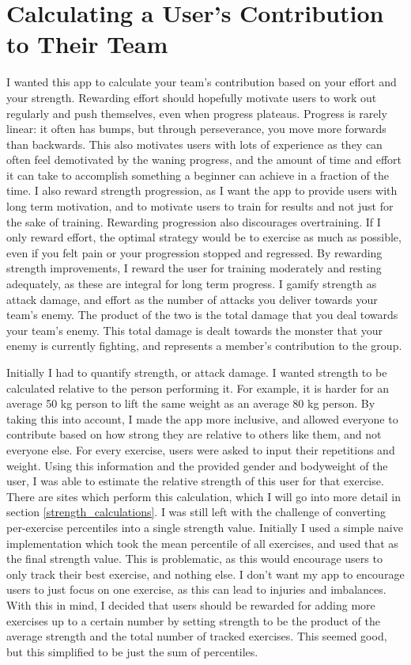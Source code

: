 \documentclass{l4proj}
\begin{document}
\section{Calculating a User's Contribution to Their Team}
I wanted this app to calculate your team's contribution based on your effort and your strength. Rewarding effort should hopefully motivate users to work out regularly and push themselves, even when progress plateaus. Progress is rarely linear: it often has bumps, but through perseverance, you move more forwards than backwards. This also motivates users with lots of experience as they can often feel demotivated by the waning progress, and the amount of time and effort it can take to accomplish something a beginner can achieve in a fraction of the time. I also reward strength progression, as I want the app to provide users with long term motivation, and to motivate users to train for results and not just for the sake of training. Rewarding progression also discourages overtraining. If I only reward effort, the optimal strategy would be to exercise as much as possible, even if you felt pain or your progression stopped and regressed. By rewarding strength improvements, I reward the user for training moderately and resting adequately, as these are integral for long term progress. I gamify strength as attack damage, and effort as the number of attacks you deliver towards your team's enemy. The product of the two is the total damage that you deal towards your team's enemy. This total damage is dealt towards the monster that your enemy is currently fighting, and represents a member's contribution to the group.

Initially I had to quantify strength, or attack damage. I wanted strength to be calculated relative to the person performing it. For example, it is harder for an average 50 kg person to lift the same weight as an average 80 kg person. By taking this into account, I made the app more inclusive, and allowed everyone to contribute based on how strong they are relative to others like them, and not everyone else. For every exercise, users were asked to input their repetitions and weight. Using this information and the provided gender and bodyweight of the user, I was able to estimate the relative strength of this user for that exercise. There are sites which perform this calculation, which I will go into more detail in section \ref{strength_calculations}. I was still left with the challenge of converting per-exercise percentiles into a single strength value. Initially I used a simple naive implementation which took the mean percentile of all exercises, and used that as the final strength value. This is problematic, as this would encourage users to only track their best exercise, and nothing else. I don't want my app to encourage users to just focus on one exercise, as this can lead to injuries and imbalances. With this in mind, I decided that users should be rewarded for adding more exercises up to a certain number by setting strength to be the product of the average strength and the total number of tracked exercises. This seemed good, but this simplified to be just the sum of percentiles.
\end{document}
